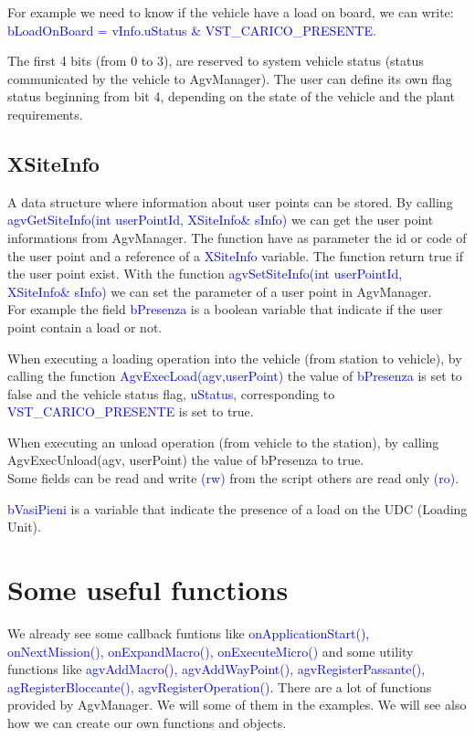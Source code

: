 For example we need to know if the vehicle have a load on board, we can write:
\textcolor{blue}{bLoadOnBoard = vInfo.uStatus  \&  VST\_CARICO\_PRESENTE}.

The first 4 bits (from 0 to 3), are reserved to system vehicle status (status communicated by the vehicle to AgvManager).
The user can define its own flag status beginning from bit 4, depending on the state of the vehicle and the plant requirements.\\

\subsection{XSiteInfo}
A data structure where information about user points can be stored.
By calling \textcolor{blue}{agvGetSiteInfo(int userPointId, XSiteInfo\& sInfo)} we can get the user point informations from AgvManager. The function have as parameter the id or code of the user point and a reference of a \textcolor{blue}{XSiteInfo} variable.
The function return true if the user point exist.
With the function \textcolor{blue}{agvSetSiteInfo(int userPointId, XSiteInfo\& sInfo)} we can set the parameter of a user point in AgvManager.\\

For example the field \textcolor{blue}{bPresenza} is a boolean variable that indicate if the user point contain a load or not.

When executing a loading operation into the vehicle (from station to vehicle), by calling the function \textcolor{blue}{AgvExecLoad(agv,userPoint)} the value of \textcolor{blue}{bPresenza} is set to false and the vehicle status flag, \textcolor{blue}{uStatus}, corresponding to \textcolor{blue}{VST\_CARICO\_PRESENTE} is set to true.

When executing an unload operation (from vehicle to the station), by calling {AgvExecUnload(agv, userPoint)} the value of {bPresenza} to true.\\

Some fields can be read and write \textcolor{blue}{(rw)} from the script others are read only \textcolor{blue}{(ro)}.

\textcolor{blue}{bVasiPieni} is a variable that indicate the presence of a load on the UDC (Loading Unit).

\section{Some useful functions}
We already see some callback funtions like \textcolor{blue}{onApplicationStart(), onNextMission(), onExpandMacro(), onExecuteMicro()} and some utility functions like \textcolor{blue}{agvAddMacro(), agvAddWayPoint(), agvRegisterPassante(), agRegisterBloccante(), agvRegisterOperation()}. There are a lot of functions provided by AgvManager. We will some of them in the examples. We will see also how we can create our own functions and objects.

